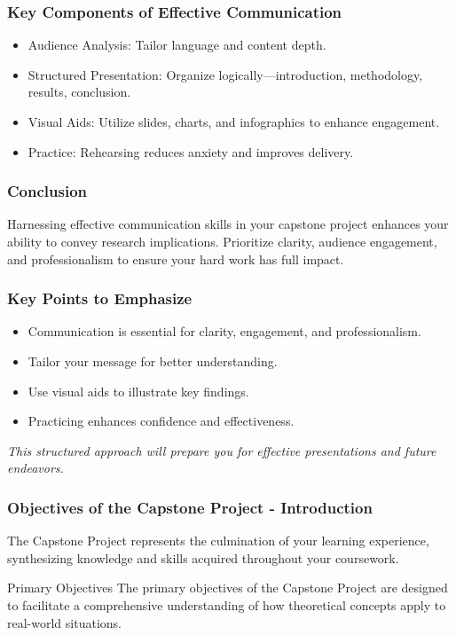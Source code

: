 \documentclass{beamer}
\begin{document}
\begin{frame}[fragile]
    \frametitle{Key Components of Effective Communication}
    \begin{itemize}
        \item Audience Analysis: Tailor language and content depth.
        \item Structured Presentation: Organize logically—introduction, methodology, results, conclusion.
        \item Visual Aids: Utilize slides, charts, and infographics to enhance engagement.
        \item Practice: Rehearsing reduces anxiety and improves delivery.
    \end{itemize}
\end{frame}

\begin{frame}[fragile]
    \frametitle{Conclusion}
    Harnessing effective communication skills in your capstone project enhances your ability to convey research implications. Prioritize clarity, audience engagement, and professionalism to ensure your hard work has full impact.
\end{frame}

\begin{frame}[fragile]
    \frametitle{Key Points to Emphasize}
    \begin{itemize}
        \item Communication is essential for clarity, engagement, and professionalism.
        \item Tailor your message for better understanding.
        \item Use visual aids to illustrate key findings.
        \item Practicing enhances confidence and effectiveness.
    \end{itemize}
    \vfill
    \textit{This structured approach will prepare you for effective presentations and future endeavors.}
\end{frame}

\begin{frame}[fragile]
    \frametitle{Objectives of the Capstone Project - Introduction}
    The Capstone Project represents the culmination of your learning experience, synthesizing knowledge and skills acquired throughout your coursework.
    
    \begin{block}{Primary Objectives}
        The primary objectives of the Capstone Project are designed to facilitate a comprehensive understanding of how theoretical concepts apply to real-world situations.
    \end{block}
\end{frame}
\end{document}
